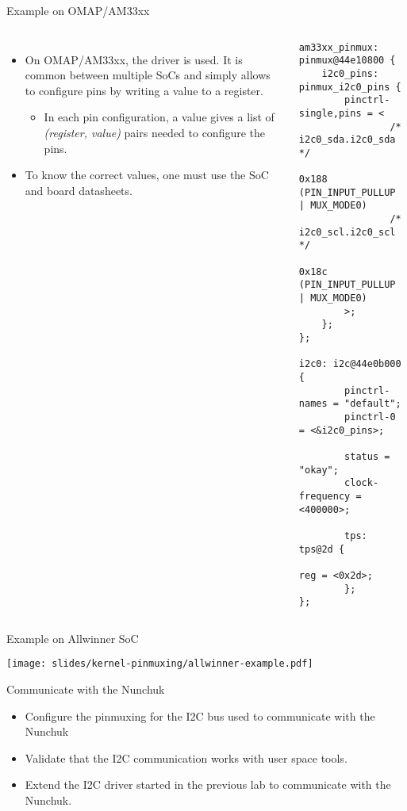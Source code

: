 \begin{frame}[fragile]{Example on OMAP/AM33xx}
  \begin{columns}
    \begin{itemize}
      \small
    \item On OMAP/AM33xx, the  driver is used. It
      is common between multiple SoCs and simply allows to configure
      pins by writing a value to a register.
      \begin{itemize}
      \item In each pin configuration, a  value
        gives a list of {\em (register, value)} pairs needed to configure
        the pins.
      \end{itemize}
    \item To know the correct values, one must use the SoC and board
      datasheets.
    \end{itemize}
    \begin{verbatim}
am33xx_pinmux: pinmux@44e10800 {
    i2c0_pins: pinmux_i2c0_pins {
        pinctrl-single,pins = <
                /* i2c0_sda.i2c0_sda */
                0x188 (PIN_INPUT_PULLUP | MUX_MODE0)
                /* i2c0_scl.i2c0_scl */
                0x18c (PIN_INPUT_PULLUP | MUX_MODE0)
        >;
    };
};

i2c0: i2c@44e0b000 {
        pinctrl-names = "default";
        pinctrl-0 = <&i2c0_pins>;

        status = "okay";
        clock-frequency = <400000>;

        tps: tps@2d {
                reg = <0x2d>;
        };
};
    \end{verbatim}
  \end{columns}
\end{frame}

\begin{frame}[fragile]{Example on Allwinner SoC}
  \begin{center}
    \texttt{[image: slides/kernel-pinmuxing/allwinner-example.pdf]}
  \end{center}
\end{frame}

\setuplabframe
{Communicate with the Nunchuk}
{
  \begin{itemize}
  \item Configure the pinmuxing for the I2C bus used to communicate
    with the Nunchuk
  \item Validate that the I2C communication works with user space
    tools.
  \item Extend the I2C driver started in the previous lab to
    communicate with the Nunchuk.
  \end{itemize}
}
